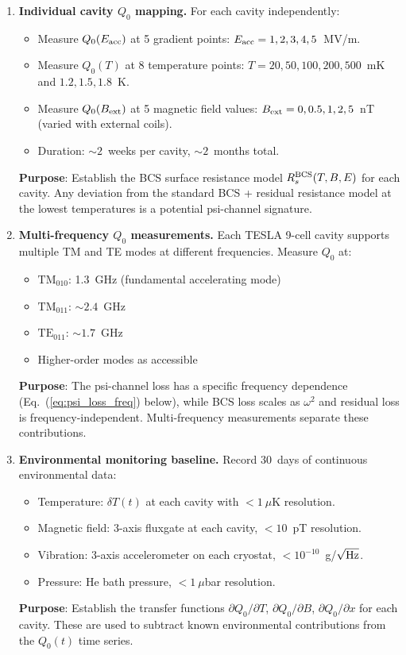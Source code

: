 \documentclass[11pt]{article}
\theoremstyle{definition}
\theoremstyle{remark}
\begin{document}
\begin{enumerate}[label=\textbf{Step \arabic*.}, itemsep=6pt]

\item \textbf{Individual cavity $Q_0$ mapping.}
  For each cavity independently:
  \begin{itemize}[nosep]
  \item Measure $Q_0(E_{\rm acc})$ at 5 gradient points:
    $E_{\rm acc} = 1, 2, 3, 4, 5$~MV/m.
  \item Measure $Q_0(T)$ at 8 temperature points:
    $T = 20, 50, 100, 200, 500$~mK and $1.2, 1.5, 1.8$~K.
  \item Measure $Q_0(B_{\rm ext})$ at 5 magnetic field values:
    $B_{\rm ext} = 0, 0.5, 1, 2, 5$~nT (varied with external coils).
  \item Duration: $\sim 2$~weeks per cavity, $\sim 2$~months total.
  \end{itemize}

  \textbf{Purpose}: Establish the BCS surface resistance model
  $R_s^{\rm BCS}(T, B, E)$ for each cavity. Any deviation from the
  standard BCS + residual resistance model at the lowest temperatures
  is a potential psi-channel signature.

\item \textbf{Multi-frequency $Q_0$ measurements.}
  Each TESLA 9-cell cavity supports multiple TM and TE modes
  at different frequencies. Measure $Q_0$ at:
  \begin{itemize}[nosep]
  \item $\text{TM}_{010}$: 1.3~GHz (fundamental accelerating mode)
  \item $\text{TM}_{011}$: $\sim 2.4$~GHz
  \item $\text{TE}_{011}$: $\sim 1.7$~GHz
  \item Higher-order modes as accessible
  \end{itemize}

  \textbf{Purpose}: The psi-channel loss has a specific frequency
  dependence (Eq.~(\ref{eq:psi_loss_freq}) below), while BCS loss
  scales as $\omega^2$ and residual loss is frequency-independent.
  Multi-frequency measurements separate these contributions.

\item \textbf{Environmental monitoring baseline.}
  Record 30~days of continuous environmental data:
  \begin{itemize}[nosep]
  \item Temperature: $\delta T(t)$ at each cavity with $<1~\mu$K resolution.
  \item Magnetic field: 3-axis fluxgate at each cavity, $< 10$~pT resolution.
  \item Vibration: 3-axis accelerometer on each cryostat, $<10^{-10}$~g/$\sqrt{\rm Hz}$.
  \item Pressure: He bath pressure, $< 1~\mu$bar resolution.
  \end{itemize}

  \textbf{Purpose}: Establish the transfer functions
  $\partial Q_0/\partial T$, $\partial Q_0/\partial B$,
  $\partial Q_0/\partial x$ for each cavity. These are used
  to subtract known environmental contributions from the $Q_0(t)$
  time series.
\end{enumerate}
\end{document}
